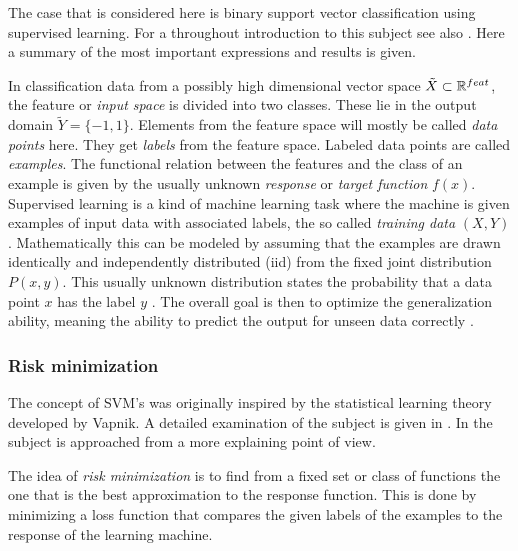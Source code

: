 The case that is considered here is binary support vector classification using supervised learning. 
For a throughout introduction to this subject see also \cite{Cristianini2000}. Here a summary of the most important expressions and results is given.

In classification data from a possibly high dimensional vector space \(\tilde{X} \subset \mathbb{R}^{feat}\), the feature or \emph{input space} is divided into two classes. These lie in the output domain \(\tilde{Y} = \{-1,1\}\). Elements from the feature space will mostly be called \emph{data points} here. They get \emph{labels} from the feature space. Labeled data points are called \emph{examples}.
The functional relation between the features and the class of an example is given by the usually unknown \emph{response} or \emph{target function} \(f(x)\).
Supervised learning is a kind of machine learning task where the machine is given examples of input data with associated labels, the so called \emph{training data} \((X,Y)\). Mathematically this can be modeled by assuming that the examples are  drawn identically and independently distributed (iid) from the fixed joint distribution \(P(x,y)\). This usually unknown distribution states the probability that a data point \(x\) has the label \(y\) \cite[p. 988]{Vapnik1999}.
The overall goal is then to optimize the generalization ability, meaning the ability to predict the output for unseen data correctly \cite[chapter 1.2]{Cristianini2000}.

\subsubsection{Risk minimization}
The concept of SVM's was originally inspired by the statistical learning theory developed by Vapnik. A detailed examination of the subject is given in \cite{Vapnik1998}. In \cite{Vapnik2013} the subject is approached from a more explaining point of view.

The idea of \emph{risk minimization} is to find from a fixed set or class of functions the one that is the best approximation to the response function. This is done by minimizing a loss function that compares the given labels of the examples to the response of the learning machine.

